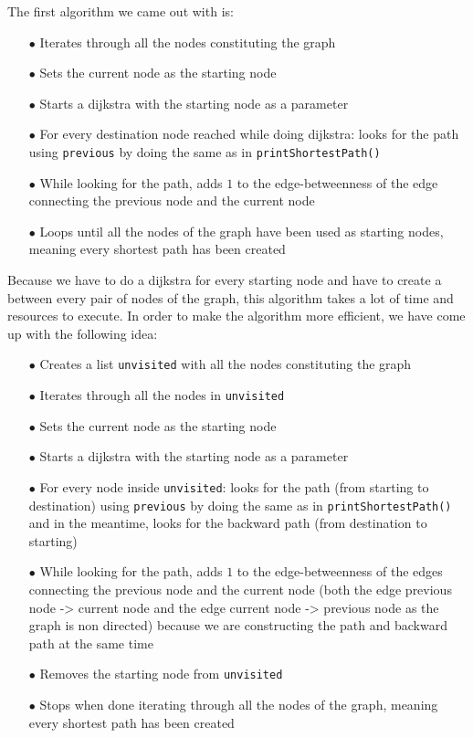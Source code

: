 \documentclass{article}
\begin{document}
The first algorithm we came out with is:

\begin{itemize}
\item[$\bullet$] Iterates through all the nodes constituting the graph
\item[$\bullet$] Sets the current node as the starting node
\item[$\bullet$] Starts a dijkstra with the starting node as a parameter
\item[$\bullet$] For every destination node reached while doing dijkstra: looks for the path using \texttt{previous} by doing the same as in \texttt{printShortestPath()}
\item[$\bullet$] While looking for the path, adds $1$ to the edge-betweenness of the edge connecting the previous node and the current node
\item[$\bullet$] Loops until all the nodes of the graph have been used as starting nodes, meaning every shortest path has been created
\end{itemize}

\medbreak

Because we have to do a dijkstra for every starting node and have to create a between every pair of nodes of the graph, this algorithm takes a lot of time and resources to execute.
In order to make the algorithm more efficient, we have come up  with the following idea:

\begin{itemize}
\item[$\bullet$] Creates a list \texttt{unvisited} with all the nodes constituting the graph
\item[$\bullet$] Iterates through all the nodes in \texttt{unvisited}
\item[$\bullet$] Sets the current node as the starting node
\item[$\bullet$] Starts a dijkstra with the starting node as a parameter
\item[$\bullet$] For every node inside \texttt{unvisited}: looks for the path (from starting to destination) using \texttt{previous} by doing the same as in \texttt{printShortestPath()} and in the meantime, looks for the backward path (from destination to starting)
\item[$\bullet$]  While looking for the path, adds $1$ to the edge-betweenness of the edges connecting the previous node and the current node (both the edge previous node -> current node and the edge current node -> previous node as the graph is non directed) because we are constructing the path and backward path at the same time
\item[$\bullet$] Removes the starting node from \texttt{unvisited}
\item[$\bullet$] Stops when done iterating through all the nodes of the graph, meaning every shortest path has been created
\end{itemize}
\end{document}
